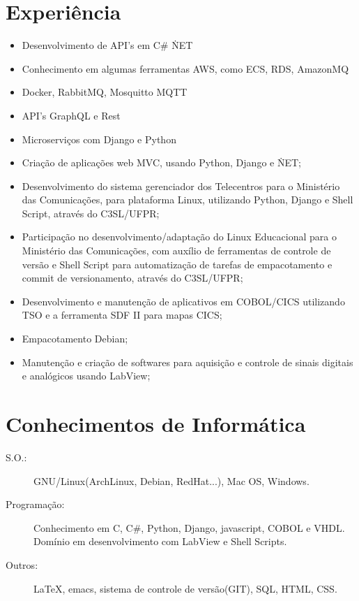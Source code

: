 \documentclass[pdftex, a4paper, 11pt]{article}
\begin{document}
\section*{Experiência}
\begin{itemize}
  \item Desenvolvimento de API's em C\# \/ \.NET
  \item Conhecimento em algumas ferramentas AWS, como ECS, RDS, AmazonMQ
  \item Docker, RabbitMQ, Mosquitto MQTT
  \item API's GraphQL e Rest
  \item Microserviços com Django e Python
  \item Criação de aplicações web MVC, usando Python, Django e \.NET;
  \item Desenvolvimento do sistema gerenciador dos Telecentros para o Ministério das Comunicações, para plataforma Linux, utilizando Python, Django e Shell Script, através do C3SL/UFPR;
  \item Participação no desenvolvimento/adaptação do Linux Educacional para o Ministério das Comunicações, com auxílio de ferramentas de controle de versão e Shell Script para automatização de tarefas de empacotamento e commit de versionamento, através do C3SL/UFPR;
  \item Desenvolvimento e manutenção de aplicativos em COBOL/CICS utilizando TSO e a ferramenta SDF II para mapas CICS;
  \item Empacotamento Debian;
  \item Manutenção e criação de softwares para aquisição e controle de sinais digitais e analógicos usando LabView; %
\end{itemize}

\section*{Conhecimentos de Informática}
\begin{description}
  \item[S.O.:] GNU/Linux(ArchLinux, Debian, RedHat...), Mac OS, Windows.
  \item[Programação:] Conhecimento em C, C\#, Python, Django, javascript, COBOL e VHDL. Domínio em desenvolvimento com LabView e Shell Scripts.
  \item[Outros:] \LaTeX, emacs, sistema de controle de versão(GIT), SQL, HTML, CSS.
\end{description}
\end{document}
